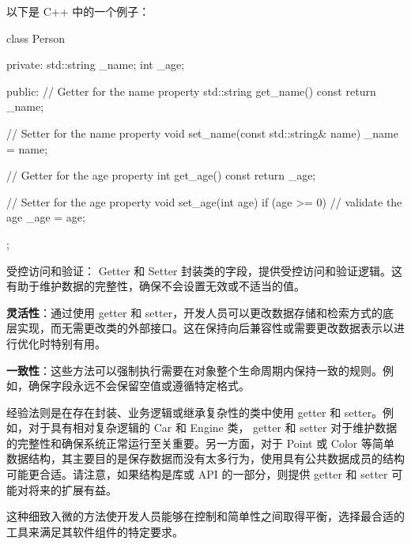 以下是 C++ 中的一个例子：

\begin{cpp}
class Person {
private:
    std::string _name;
    int _age;

public:
    // Getter for the name property
    std::string get_name() const { return _name; }

    // Setter for the name property
    void set_name(const std::string& name) { _name = name; }

    // Getter for the age property
    int get_age() const { return _age; }

    // Setter for the age property
    void set_age(int age) {
        if (age >= 0) { // validate the age
            _age = age;
        }
    }
};
\end{cpp}


受控访问和验证： Getter 和 Setter 封装类的字段，提供受控访问和验证逻辑。这有助于维护数据的完整性，确保不会设置无效或不适当的值。

\textbf{灵活性}：通过使用 getter 和 setter，开发人员可以更改数据存储和检索方式的底层实现，而无需更改类的外部接口。这在保持向后兼容性或需要更改数据表示以进行优化时特别有用。

\textbf{一致性}：这些方法可以强制执行需要在对象整个生命周期内保持一致的规则。例如，确保字段永远不会保留空值或遵循特定格式。


经验法则是在存在封装、业务逻辑或继承复杂性的类中使用 getter 和 setter。例如，对于具有相对复杂逻辑的 Car 和 Engine 类， getter 和 setter 对于维护数据的完整性和确保系统正常运行至关重要。另一方面，对于 Point 或 Color 等简单数据结构，其主要目的是保存数据而没有太多行为，使用具有公共数据成员的结构可能更合适。请注意，如果结构是库或 API 的一部分，则提供 getter 和 setter 可能对将来的扩展有益。

这种细致入微的方法使开发人员能够在控制和简单性之间取得平衡，选择最合适的工具来满足其软件组件的特定要求。

